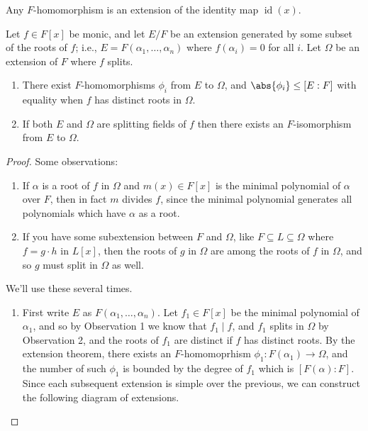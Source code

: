\begin{corollary}
Any $F$-homomorphism is an extension of the identity map $\operatorname{id}(x)$.
\end{corollary}

\begin{proposition}
Let $f \in F[x]$ be monic, and let $E/F$ be an extension generated by some subset of the roots of $f$; i.e., $E = F(\alpha_1, \dotsc, \alpha_n)$ where $f(\alpha_i) = 0$ for all $i$. Let $\Omega$ be an extension of $F$ where $f$ splits.
\begin{enumerate}[label={\textup{(\alph*)}}]
\item There exist $F$-homomorphisms $\phi_i$ from $E$ to $\Omega$, and $\abs{\phi_i} \leq [E : F]$ with equality when $f$ has distinct roots in $\Omega$.
\item If both $E$ and $\Omega$ are splitting fields of $f$ then there exists an $F$-isomorphism from $E$ to $\Omega$.
\end{enumerate}
\end{proposition}

\begin{proof}
Some observations:
\begin{enumerate}
\item If $\alpha$ is a root of $f$ in $\Omega$ and $m(x) \in F[x]$ is the minimal polynomial of $\alpha$ over $F$, then in fact $m$ divides $f$, since the minimal polynomial generates all polynomials which have $\alpha$ as a root.
\item If you have some subextension between $F$ and $\Omega$, like $F \subseteq L \subseteq \Omega$ where $f = g \cdot h$ in $L[x]$, then the roots of $g$ in $\Omega$ are among the roots of $f$ in $\Omega$, and so $g$ must split in $\Omega$ as well.
\end{enumerate}
We'll use these several times. 
\begin{enumerate}[label={\textup{(\alph*)}}]
\item  First write $E$ as $F(\alpha_1, \dotsc, \alpha_n)$. Let $f_1 \in F[x]$ be the minimal polynomial of $\alpha_1$, and so by Observation 1 we know that $f_1 \mid f$, and $f_1$ splits in $\Omega$ by Observation 2, and the roots of $f_1$ are distinct if $f$ has distinct roots. By the extension theorem, there exists an $F$-homomoprhism $\phi_1\colon F(\alpha_1) \to \Omega$, and the number of such $\phi_1$ is bounded by the degree of $f_1$ which is $[F(\alpha) : F]$. Since each subsequent extension is simple over the previous, we can construct the following diagram of extensions.
\begin{center}
\end{center}
\end{enumerate}
\end{proof}
